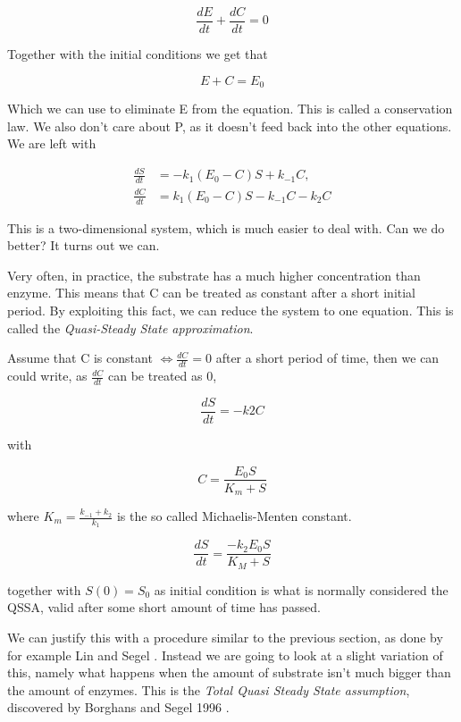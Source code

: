 \documentclass[12pt]{article}
\begin{document}
\begin{equation}
\frac{dE}{dt} + \frac{dC}{dt} = 0
\end{equation}

Together with the initial conditions we get that

\begin{equation}
E + C = E_0
\end{equation}

Which we can use to eliminate E from the equation. This is called a conservation
law.  We also don't care about P, as it doesn't feed back into the other
equations. We are left with

\begin{align}
\frac{dS}{dt} &= -k_1(E_0 - C)S + k_{-1}C, \\
\frac{dC}{dt} &= k_1(E_0 - C)S - k_{-1}C - k_2 C
\end{align}

This is a two-dimensional system, which is much easier to deal with. Can we do
better? It turns out we can.

Very often, in practice, the substrate has a much higher concentration than enzyme. This
means that C can be treated as constant after a short initial period. By
exploiting this fact, we can reduce the system to one equation. This is called
the \textit{Quasi-Steady State approximation}.

Assume that C is constant $\iff \frac{dC}{dt} = 0$ after a short period of time,
then we can could write, as $\frac{dC}{dt}$ can be treated as 0,

\begin{equation}
\frac{dS}{dt} = -k2 C
\end{equation}

with

\begin{equation}
C = \frac{E_0 S}{K_m +S}
\end{equation}

where $K_m = \frac{k_{-1} + k_2}{k_1}$ is the so called {Michaelis-Menten
constant}.

\begin{equation}
\frac{dS}{dt} = \frac{-k_2 E_0 S}{K_M + S}
\end{equation}

together with $S(0) = S_0$ as initial condition is what is normally considered
the QSSA, valid after some short amount of time has passed.

We can justify this with a procedure similar to the previous section, as done by
for example Lin and Segel \cite{lin1974mathematics}. Instead we are going to
look at a slight variation of this, namely what happens when the amount of
substrate isn't much bigger than the amount of enzymes. This is the
\textit{Total Quasi Steady State assumption}, discovered by Borghans and Segel
1996 \cite{borghans1996extending}.
\end{document}
